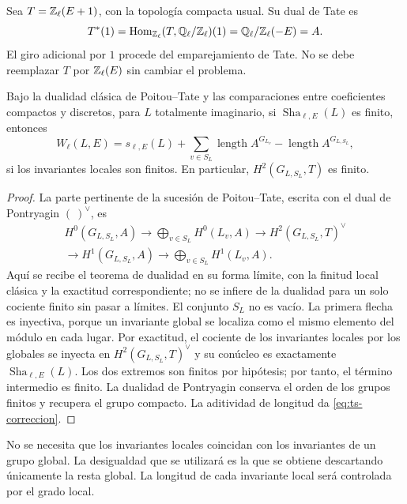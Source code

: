 Sea $T=\mathbb{Z}_\ell(E+1)$, con la topología compacta usual. Su dual de Tate es
\begin{equation}
 T^*(1)=\operatorname{Hom}_{\mathbb{Z}_\ell}(T,\mathbb{Q}_\ell/\mathbb{Z}_\ell)(1)
       =\mathbb{Q}_\ell/\mathbb{Z}_\ell(-E)=A.
 \label{eq:ts-dual}
\end{equation}
El giro adicional por $1$ procede del emparejamiento de Tate. No se debe reemplazar $T$ por $\mathbb{Z}_\ell(E)$ sin cambiar el problema.

\begin{proposicion}
\label{prop:ts-dualidad}
Bajo la dualidad clásica de Poitou--Tate y las comparaciones entre coeficientes compactos y discretos, para $L$ totalmente imaginario, si $\operatorname{Sha}_{\ell,E}(L)$ es finito, entonces
\begin{equation}
 W_\ell(L,E)=s_{\ell,E}(L)+\sum_{v\in S_L}\operatorname{length} A^{G_{L_v}}
                                  -\operatorname{length} A^{G_{L,S_L}},
 \label{eq:ts-correccion}
\end{equation}
si los invariantes locales son finitos. En particular, $H^2(G_{L,S_L},T)$ es finito.
\end{proposicion}
\begin{proof}
La parte pertinente de la sucesión de Poitou--Tate, escrita con el dual de Pontryagin $(\ )^\vee$, es
\[
 \begin{gathered}
 H^0(G_{L,S_L},A)\longrightarrow\bigoplus_{v\in S_L}H^0(L_v,A)
 \longrightarrow H^2(G_{L,S_L},T)^\vee\\
 \longrightarrow H^1(G_{L,S_L},A)\longrightarrow
 \bigoplus_{v\in S_L}H^1(L_v,A).
 \end{gathered}
\]
Aquí se recibe el teorema de dualidad en su forma límite, con la finitud local clásica y la exactitud correspondiente; no se infiere de la dualidad para un solo cociente finito sin pasar a límites. El conjunto $S_L$ no es vacío. La primera flecha es inyectiva, porque un invariante global se localiza como el mismo elemento del módulo en cada lugar. Por exactitud, el cociente de los invariantes locales por los globales se inyecta en $H^2(G_{L,S_L},T)^\vee$ y su conúcleo es exactamente $\operatorname{Sha}_{\ell,E}(L)$. Los dos extremos son finitos por hipótesis; por tanto, el término intermedio es finito. La dualidad de Pontryagin conserva el orden de los grupos finitos y recupera el grupo compacto. La aditividad de longitud da \eqref{eq:ts-correccion}.
\end{proof}

No se necesita que los invariantes locales coincidan con los invariantes de un grupo global. La desigualdad que se utilizará es la que se obtiene descartando únicamente la resta global. La longitud de cada invariante local será controlada por el grado local.


